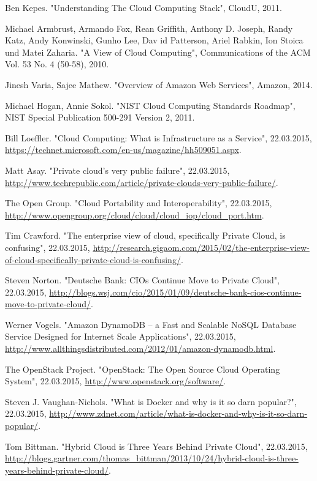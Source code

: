 \begin{thebibliography}{1}
Ben Kepes. "Understanding The Cloud Computing Stack", CloudU, 2011.

Michael Armbrust, Armando Fox, Rean Griffith, Anthony D. Joseph, Randy Katz, Andy Konwinski, Gunho Lee, Dav id Patterson, Ariel Rabkin, Ion Stoica und Matei Zaharia. "A View of Cloud Computing", Communications of the ACM Vol. 53 No. 4 (50-58), 2010.

Jinesh Varia, Sajee Mathew. "Overview of Amazon Web Services", Amazon, 2014.

Michael Hogan, Annie Sokol. "NIST Cloud Computing Standards Roadmap", NIST Special Publication 500-291 Version 2, 2011.

Bill Loeffler. "Cloud Computing: What is Infrastructure as a Service", 22.03.2015, \url{https://technet.microsoft.com/en-us/magazine/hh509051.aspx}.

Matt Asay. "Private cloud's very public failure", 22.03.2015, \url{http://www.techrepublic.com/article/private-clouds-very-public-failure/}.

The Open Group. "Cloud Portability and Interoperability", 22.03.2015, \url{http://www.opengroup.org/cloud/cloud/cloud_iop/cloud_port.htm}.

Tim Crawford. "The enterprise view of cloud, specifically Private Cloud, is confusing", 22.03.2015, \url{http://research.gigaom.com/2015/02/the-enterprise-view-of-cloud-specifically-private-cloud-is-confusing/}.

Steven Norton. "Deutsche Bank: CIOs Continue Move to Private Cloud", 22.03.2015, \url{http://blogs.wsj.com/cio/2015/01/09/deutsche-bank-cios-continue-move-to-private-cloud/}.

Werner Vogels. "Amazon DynamoDB – a Fast and Scalable NoSQL Database Service Designed for Internet Scale Applications", 22.03.2015, \url{http://www.allthingsdistributed.com/2012/01/amazon-dynamodb.html}.

The OpenStack Project. "OpenStack: The Open Source Cloud Operating System", 22.03.2015, \url{http://www.openstack.org/software/}.

Steven J. Vaughan-Nichols. "What is Docker and why is it so darn popular?", 22.03.2015, \url{http://www.zdnet.com/article/what-is-docker-and-why-is-it-so-darn-popular/}.

Tom Bittman. "Hybrid Cloud is Three Years Behind Private Cloud", 22.03.2015, \url{http://blogs.gartner.com/thomas_bittman/2013/10/24/hybrid-cloud-is-three-years-behind-private-cloud/}.


\end{thebibliography}
